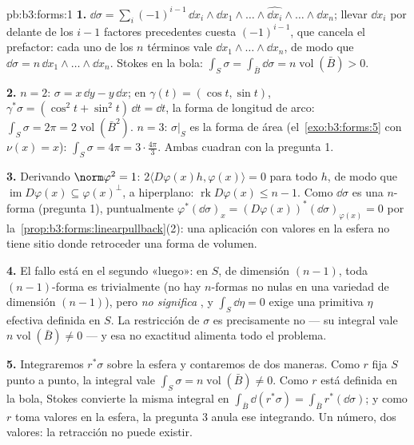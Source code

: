\begin{solution}{pb:b3:forms:1}
\textbf{1.} $\dd\sigma = \sum_i(-1)^{i-1}\,\dd x_i\wedge\dd
x_1\wedge\dots\wedge\widehat{\dd x_i}\wedge\dots\wedge\dd
x_n$; llevar $\dd x_i$ por delante de los $i-1$ factores precedentes
cuesta $(-1)^{i-1}$, que cancela el prefactor: cada uno de los $n$
términos vale $\dd x_1\wedge\dots\wedge\dd x_n$, de modo que
$\dd\sigma = n\,\dd x_1\wedge\dots\wedge\dd x_n$. Stokes en la bola:
$\int_S\sigma = \int_{\bar B}\dd\sigma =
n\operatorname{vol}(\bar B) > 0$.

\textbf{2.} $n = 2$: $\sigma = x\,\dd y - y\,\dd x$; en
$\gamma(t) = (\cos t, \sin t)$, $\gamma^*\sigma = (\cos^2t +
\sin^2t)\,\dd t = \dd t$, la forma de longitud de arco:
$\int_S\sigma = 2\pi = 2\operatorname{vol}(\bar B^2)$.
$n = 3$: $\sigma\vert_S$ es la forma de área (el~\cref{exo:b3:forms:5}
con $\nu(x) = x$): $\int_S\sigma = 4\pi = 3\cdot\tfrac{4\pi}3$. Ambas
cuadran con la pregunta 1.

\textbf{3.} Derivando $\norm\varphi^2 = 1$: $2\langle
D\varphi(x)h, \varphi(x)\rangle = 0$ para todo $h$, de modo que
$\operatorname{im}D\varphi(x) \subseteq \varphi(x)^\perp$, a
hiperplano: $\operatorname{rk}D\varphi(x) \leq n - 1$. Como $\dd\sigma$
es una $n$-forma (pregunta 1), puntualmente $\varphi^*(\dd\sigma)_x =
(D\varphi(x))^*(\dd\sigma)_{\varphi(x)} = 0$ por
la~\cref{prop:b3:forms:linearpullback}(2): una aplicación con valores en
la esfera no tiene sitio donde retroceder una forma de volumen.

\textbf{4.} El fallo está en el segundo «luego»: en $S$, de dimensión
$(n-1)$, toda $(n-1)$-forma es trivialmente
 (no hay $n$-formas no nulas
en una variedad de dimensión $(n-1)$), pero
\emph{ no significa
}, y $\int_S\dd\eta = 0$ exige
una primitiva $\eta$ efectiva definida en $S$. La restricción de
$\sigma$ es precisamente no 
--- su integral vale $n\operatorname{vol}(\bar B) \neq
0$ --- y esa no exactitud alimenta todo el problema.

\textbf{5.} Integraremos $r^*\sigma$ sobre la esfera y contaremos de dos
maneras. Como $r$ fija $S$ punto a punto, la integral vale
$\int_S\sigma = n\operatorname{vol}(\bar B)
\neq 0$. Como $r$ está definida en la bola, Stokes convierte la misma
integral en $\int_{\bar B}\dd(r^*\sigma) =
\int_{\bar B}r^*(\dd\sigma)$; y como $r$ toma valores en la esfera, la
pregunta 3 anula ese integrando. Un número, dos valores: la retracción
no puede existir.


\end{solution}
